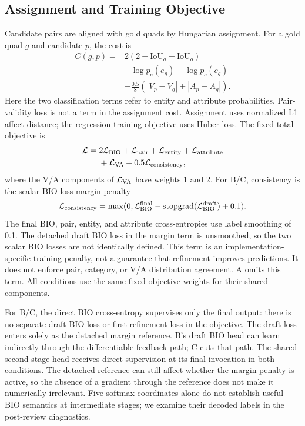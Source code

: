 \documentclass[conference]{IEEEtran}
\begin{document}
\subsection{Assignment and Training Objective}
Candidate pairs are aligned with gold quads by Hungarian assignment. For a gold quad $g$ and candidate $p$, the cost is
\begin{align}
 C(g,p)={}&2(2-\mathrm{IoU}_a-\mathrm{IoU}_o)\nonumber\\
 &-\log p_e(e_g)-\log p_c(c_g)\nonumber\\
 &+\frac{0.5}{8}(|V_p-V_g|+|A_p-A_g|).
\end{align}
Here the two classification terms refer to entity and attribute probabilities. Pair-validity loss is not a term in the assignment cost. Assignment uses normalized L1 affect distance; the regression training objective uses Huber loss. The fixed total objective is
\begin{align}
\mathcal L={}&2\mathcal L_{\rm BIO}+\mathcal L_{\rm pair}
 +\mathcal L_{\rm entity}+\mathcal L_{\rm attribute}\nonumber\\
 &+\mathcal L_{\rm VA}+0.5\mathcal L_{\rm consistency},
\end{align}
where the V/A components of $\mathcal L_{\rm VA}$ have weights 1 and 2. For B/C, consistency is the scalar BIO-loss margin penalty
\begin{equation}
\mathcal L_{\rm consistency}=\max(0,\mathcal L_{\rm BIO}^{\rm final}
-\operatorname{stopgrad}(\mathcal L_{\rm BIO}^{\rm draft})+0.1).
\end{equation}
The final BIO, pair, entity, and attribute cross-entropies use label smoothing of 0.1. The detached draft BIO loss in the margin term is unsmoothed, so the two scalar BIO losses are not identically defined. This term is an implementation-specific training penalty, not a guarantee that refinement improves predictions. It does not enforce pair, category, or V/A distribution agreement. A omits this term. All conditions use the same fixed objective weights for their shared components.

For B/C, the direct BIO cross-entropy supervises only the final output: there is no separate draft BIO loss or first-refinement loss in the objective. The draft loss enters solely as the detached margin reference. B's draft BIO head can learn indirectly through the differentiable feedback path; C cuts that path. The shared second-stage head receives direct supervision at its final invocation in both conditions. The detached reference can still affect whether the margin penalty is active, so the absence of a gradient through the reference does not make it numerically irrelevant. Five softmax coordinates alone do not establish useful BIO semantics at intermediate stages; we examine their decoded labels in the post-review diagnostics.
\end{document}
